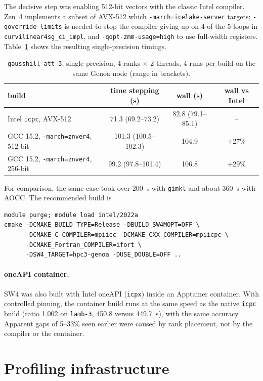 \documentclass[11pt,a4paper]{article}
\newcommand{\code}[1]{\texttt{#1}}
\begin{document}
The decisive step was enabling 512-bit vectors with the classic Intel compiler.
Zen~4 implements a subset of AVX-512 which \code{-march=icelake-server}
targets; \code{-qoverride-limits} is needed to stop the compiler giving up on
4 of the 5 loops in \code{curvilinear4sg\_ci\_impl}, and
\code{-qopt-zmm-usage=high} to use full-width registers. Table~\ref{tab:intel}
shows the resulting single-precision timings.

\begin{table}[ht]
  \centering
  \caption{\code{gausshill-att-3}, single precision, 4 ranks $\times$ 2 threads,
    4 runs per build on the same Genoa node (range in brackets).}
  \label{tab:intel}
  \begin{tabular}{lccc}
    \toprule
    build & time stepping (s) & wall (s) & wall vs Intel \\
    \midrule
    Intel \code{icpc}, AVX-512 & 71.3 (69.2--73.2) & 82.8 (79.1--85.1) & -- \\
    GCC 15.2, \code{-march=znver4}, 512-bit & 101.3 (100.5--102.3) & 104.9 & +27\% \\
    GCC 15.2, \code{-march=znver4}, 256-bit & 99.2 (97.8--101.4) & 106.8 & +29\% \\
    \bottomrule
  \end{tabular}
\end{table}

For comparison, the same case took over 200~s with \code{gimkl} and about
360~s with AOCC. The recommended build is
\begin{lstlisting}
module purge; module load intel/2022a
cmake -DCMAKE_BUILD_TYPE=Release -DBUILD_SW4MOPT=OFF \
      -DCMAKE_C_COMPILER=mpiicc -DCMAKE_CXX_COMPILER=mpiicpc \
      -DCMAKE_Fortran_COMPILER=ifort \
      -DSW4_TARGET=hpc3-genoa -DUSE_DOUBLE=OFF ..
\end{lstlisting}

\paragraph{oneAPI container.} SW4 was also built with Intel oneAPI
(\code{icpx}) inside an Apptainer container. With controlled pinning, the
container build runs at the same speed as the native \code{icpc} build
(ratio 1.002 on \code{lamb-3}, 450.8 versus 449.7~s), with the same accuracy.
Apparent gaps of 5--33\% seen earlier were caused by rank placement, not by the
compiler or the container.

\section{Profiling infrastructure}
\label{sec:timers}
\end{document}
